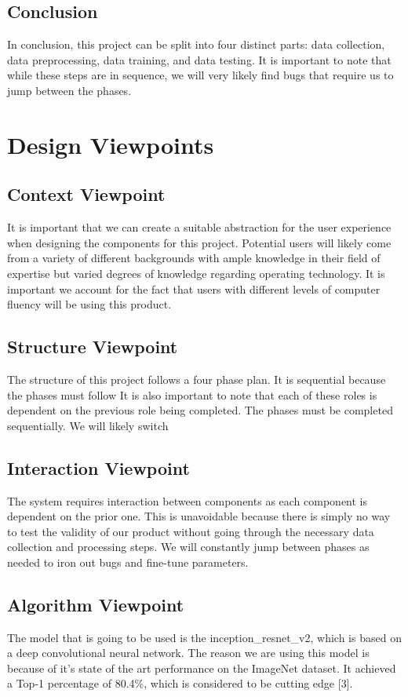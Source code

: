 \documentclass[onecolumn, draftclsnofoot,10pt, compsoc]{IEEEtran}
\begin{document}
\subsection{Conclusion}

In conclusion, this project can be split into four distinct parts: data collection, data preprocessing, data training, and data testing. It is important to note that while these steps are in sequence, we will very likely find bugs that require us to jump between the phases. 

\section{Design Viewpoints}

\subsection{Context Viewpoint}
It is important that we can create a suitable abstraction for the user experience when designing the components for this project. Potential users will likely come from a variety of different backgrounds with ample knowledge in their field of expertise but varied degrees of knowledge regarding operating technology. It is important we account for the fact that users with different levels of computer fluency will be using this product.
\subsection{Structure Viewpoint}
The structure of this project follows a four phase plan. It is sequential because the phases must follow  It is also important to note that each of these roles is dependent on the previous role being completed. The phases must be completed sequentially. We will likely switch 
\subsection{Interaction Viewpoint}
The system requires interaction between components as each component is dependent on the prior one. This is unavoidable because there is simply no way to test the validity of our product without going through the necessary data collection and processing steps. We will constantly jump between phases as needed to iron out bugs and fine-tune parameters.
\subsection{Algorithm Viewpoint}
The model that is going to be used is the inception\_resnet\_v2, which is based on a deep convolutional neural network. The reason we are using this model is because of it's state of the art performance on the ImageNet dataset. It achieved a Top-1 percentage of 80.4\%, which is considered to be cutting edge [3]. 
\end{document}
